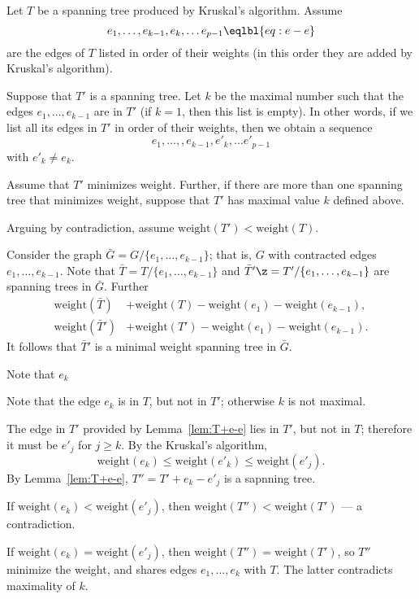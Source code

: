 Let $T$ be a spanning tree produced by Kruskal’s algorithm.
Assume 
\[e_1,\dots,e_{k-1},e_k,\dots e_{p-1}\eqlbl{eq:e-e}\] 
are the edges of $T$ listed in order of their weights
(in this order they are added by Kruskal’s algorithm).

Suppose that $T'$ is a spanning tree.
Let $k$ be the maximal number such that the edges  $e_1,\dots,e_{k-1}$ are in $T'$ (if $k=1$, then this list is empty). 
In other words, if we list all its edges in $T'$ in order of their weights, then 
we obtain a sequence 
\[e_1,\dots,,e_{k-1},e'_k,\dots e'_{p-1}\]
with $e'_k\ne e_k$.

Assume that $T'$ minimizes weight.
Further, if there are more than one spanning tree that minimizes weight, suppose that $T'$ has maximal value $k$ defined above.

Arguing by contradiction, assume $\mathrm{weight}(T')< \mathrm{weight}(T)$.

Consider the graph $\bar G=G/\{e_1,\dots,e_{k-1}\}$;
that is, $G$ with contracted edges $e_1,\dots,e_{k-1}$.
Note that $\bar T=T/\{e_1,\dots,e_{k-1}\}$ and $\bar T'\z=T'/\{e_1,\dots,e_{k-1}\}$ are spanning trees in $\bar G$.
Further 
\begin{align*}
\mathrm{weight}(\bar T)&+\mathrm{weight}(T)-\mathrm{weight}(e_1)-\mathrm{weight}(e_{k-1}),
\\
\mathrm{weight}(\bar T')&+\mathrm{weight}(T')-\mathrm{weight}(e_1)-\mathrm{weight}(e_{k-1}).
\end{align*}
It follows that 
$\bar T'$ is a minimal weight spanning tree in $\bar G$.

Note that $e_k$ 


Note that the edge $e_k$ is in $T$, but not in $T'$; otherwise $k$ is not maximal.

The edge in $T'$ provided by Lemma~\ref{lem:T+e-e} lies in $T'$, but not in $T$;
therefore it must be $e'_j$ for $j\ge k$.
By the Kruskal’s algorithm,
\[\mathrm{weight}(e_k)\le \mathrm{weight}(e'_k)\le \mathrm{weight}(e'_j).\]
By Lemma~\ref{lem:T+e-e}, $T''=T'+e_k-e'_j$ is a sapnning tree.

If $\mathrm{weight}(e_k)< \mathrm{weight}(e'_j)$, then $\mathrm{weight}(T'')<\mathrm{weight}(T')$ --- a contradiction.

If $\mathrm{weight}(e_k)=\mathrm{weight}(e'_j)$, then $\mathrm{weight}(T'')=\mathrm{weight}(T')$, so $T''$ minimize the weight, and shares edges $e_1,\dots,e_k$ with $T$.
The latter contradicts maximality of $k$.
\qeds


